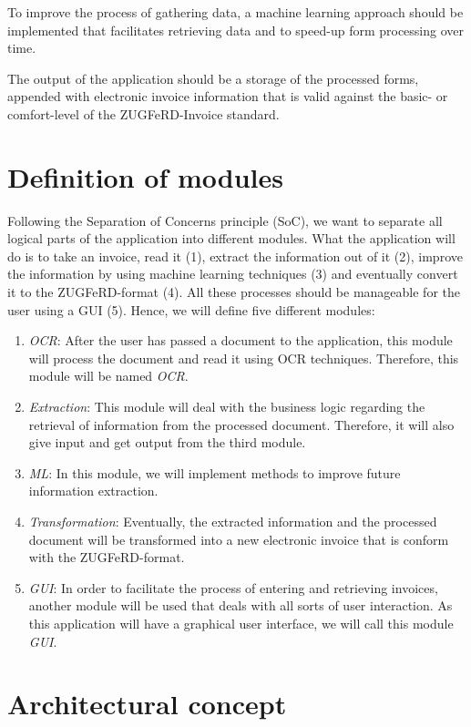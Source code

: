 To improve the process of gathering data, a machine learning approach should be implemented that facilitates retrieving data and to speed-up form processing over time.

The output of the application should be a storage of the processed forms, appended with electronic invoice information that is valid against the basic- or comfort-level of the ZUGFeRD-Invoice standard.

\section{Definition of modules}
\label{sec5.2}

Following the Separation of Concerns principle (SoC), we want to separate all logical parts of the application into different modules.
What the application will do is to take an invoice, read it (1), extract the information out of it (2), improve the information by using machine learning techniques (3) and eventually convert it to the ZUGFeRD-format (4). All these processes should be manageable for the user using a GUI (5).
Hence, we will define five different modules:
\begin{enumerate}
	\item \emph{OCR}: After the user has passed a document to the application, this module will process the document and read it using OCR techniques. Therefore, this module will be named \emph{OCR}.
	\item \emph{Extraction}: This module will deal with the business logic regarding the retrieval of information from the processed document. Therefore, it will also give input and get output from the third module.
	\item \emph{ML}: In this module, we will implement methods to improve future information extraction.
	\item \emph{Transformation}: Eventually, the extracted information and the processed document will be transformed into a new electronic invoice that is conform with the ZUGFeRD-format.
	\item \emph{GUI}: In order to facilitate the process of entering and retrieving invoices, another module will be used that deals with all sorts of user interaction. As this application will have a graphical user interface, we will call this module \emph{GUI}.
\end{enumerate}

\section{Architectural concept}
\label{sec5.3}

